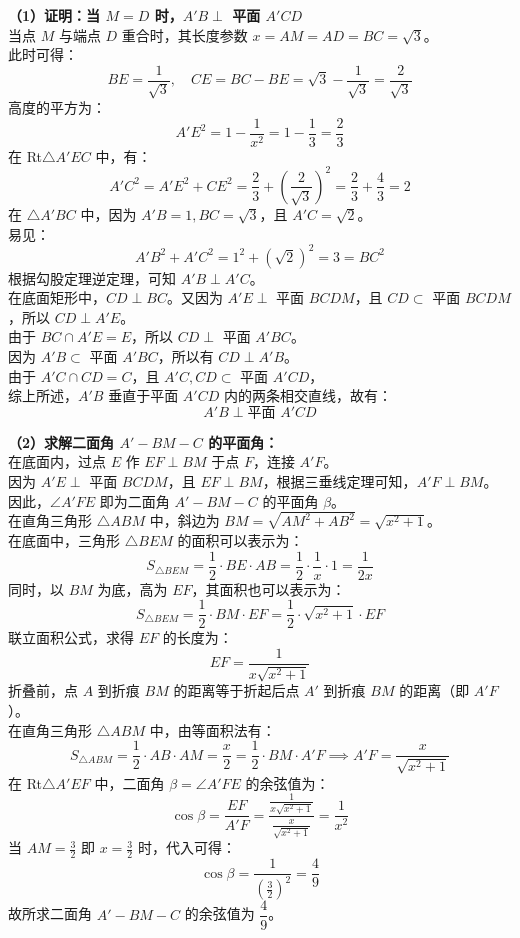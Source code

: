 {  \noindent\textbf{（1）证明：当 $M=D$ 时，$A'B \perp$ 平面 $A'CD$}\\
  当点 $M$ 与端点 $D$ 重合时，其长度参数 $x = AM = AD = BC = \sqrt{3}$。\\
  此时可得：
  \[ BE = \frac{1}{\sqrt{3}},\quad CE = BC - BE = \sqrt{3} - \frac{1}{\sqrt{3}} = \frac{2}{\sqrt{3}} \]
  高度的平方为：
  \[ A'E^2 = 1 - \frac{1}{x^2} = 1 - \frac{1}{3} = \frac{2}{3} \]
  在 Rt$\triangle A'EC$ 中，有：
  \[ A'C^2 = A'E^2 + CE^2 = \frac{2}{3} + \left(\frac{2}{\sqrt{3}}\right)^2 = \frac{2}{3} + \frac{4}{3} = 2 \]
  在 $\triangle A'BC$ 中，因为 $A'B = 1, BC = \sqrt{3}$，且 $A'C = \sqrt{2}$。\\
  易见：
  \[ A'B^2 + A'C^2 = 1^2 + (\sqrt{2})^2 = 3 = BC^2 \]
  根据勾股定理逆定理，可知 $\boxed{A'B \perp A'C}$。\\
  在底面矩形中，$CD \perp BC$。又因为 $A'E \perp$ 平面 $BCDM$，且 $CD \subset$ 平面 $BCDM$，所以 $CD \perp A'E$。\\
  由于 $BC \cap A'E = E$，所以 $CD \perp$ 平面 $A'BC$。\\
  因为 $A'B \subset$ 平面 $A'BC$，所以有 $\boxed{CD \perp A'B}$。\\
  由于 $A'C \cap CD = C$，且 $A'C, CD \subset$ 平面 $A'CD$，\\
  综上所述，$A'B$ 垂直于平面 $A'CD$ 内的两条相交直线，故有：
  \[ \boxed{A'B \perp \text{平面 } A'CD} \]

  \noindent\textbf{（2）求解二面角 $A'-BM-C$ 的平面角：}\\
  在底面内，过点 $E$ 作 $EF \perp BM$ 于点 $F$，连接 $A'F$。\\
  因为 $A'E \perp$ 平面 $BCDM$，且 $EF \perp BM$，根据三垂线定理可知，$\boxed{A'F \perp BM}$。\\
  因此，$\angle A'FE$ 即为二面角 $A'-BM-C$ 的平面角 $\beta$。\\
  在直角三角形 $\triangle ABM$ 中，斜边为 $BM = \sqrt{AM^2 + AB^2} = \sqrt{x^2 + 1}$。\\
  在底面中，三角形 $\triangle BEM$ 的面积可以表示为：
  \[ S_{\triangle BEM} = \frac{1}{2} \cdot BE \cdot AB = \frac{1}{2} \cdot \frac{1}{x} \cdot 1 = \frac{1}{2x} \]
  同时，以 $BM$ 为底，高为 $EF$，其面积也可以表示为：
  \[ S_{\triangle BEM} = \frac{1}{2} \cdot BM \cdot EF = \frac{1}{2} \cdot \sqrt{x^2+1} \cdot EF \]
  联立面积公式，求得 $EF$ 的长度为：
  \[ EF = \frac{1}{x\sqrt{x^2+1}} \]
  折叠前，点 $A$ 到折痕 $BM$ 的距离等于折起后点 $A'$ 到折痕 $BM$ 的距离（即 $A'F$）。\\
  在直角三角形 $\triangle ABM$ 中，由等面积法有：
  \[ S_{\triangle ABM} = \frac{1}{2} \cdot AB \cdot AM = \frac{x}{2} = \frac{1}{2} \cdot BM \cdot A'F \implies A'F = \frac{x}{\sqrt{x^2+1}} \]
  在 Rt$\triangle A'EF$ 中，二面角 $\beta = \angle A'FE$ 的余弦值为：
  \[ \cos\beta = \frac{EF}{A'F} = \frac{\frac{1}{x\sqrt{x^2+1}}}{\frac{x}{\sqrt{x^2+1}}} = \boxed{\frac{1}{x^2}} \]
  当 $AM = \frac{3}{2}$ 即 $x = \frac{3}{2}$ 时，代入可得：
  \[ \cos\beta = \frac{1}{\left(\frac{3}{2}\right)^2} = \frac{4}{9} \]
  故所求二面角 $A'-BM-C$ 的余弦值为 $\boxed{\dfrac{4}{9}}$。

}
